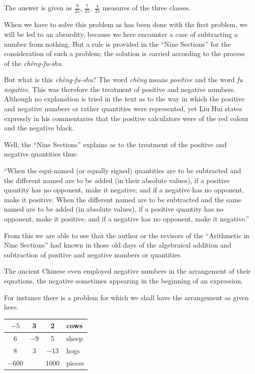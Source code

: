 \documentclass[11pt]{article}
\newcommand{\scanpage}[2]{\clearpage\setcounter{footnote}{0}\noindent{\footnotesize\color{gray}PDF page #1 · #2}\par\medskip}
\newcommand{\scanfooter}{}
\newcommand{\fangtableF}{\begin{tabular}{|c|c|c|l|}\hline $-5$&3&2&cows\\\hline 6&$-9$&5&sheep\\\hline 8&3&$-13$&hogs\\\hline $-600$&&1000&pieces\\\hline\end{tabular}}
\begin{document}
The answer is given as $\frac9{25}$, $\frac7{25}$, $\frac4{25}$ measures of the three classes.

When we have to solve this problem as has been done with the first problem, we will be led to an absurdity, because we here encounter a case of subtracting a number from nothing. But a rule is provided in the ``Nine Sections'' for the consideration of such a problem; the solution is carried according to the process of the \emph{chêng-fu-shu}.

But what is this \emph{chêng-fu-shu}? The word \emph{chêng} means \emph{positive} and the word \emph{fu} \emph{negative}. This was therefore the treatment of positive and negative numbers. Although no explanation is tried in the text as to the way in which the positive and negative numbers or rather quantities were represented, yet Liu Hui states expressly in his commentaries that the positive calculators were of the red colour and the negative black.

Well, the ``Nine Sections'' explains as to the treatment of the positive and negative quantities thus:
\scanfooter

\scanpage{0035}{Chapter 3, printed page 21}
``When the equi-named (or equally signed) quantities are to be subtracted and the different named are to be added (in their absolute values), if a positive quantity has no opponent, make it negative; and if a negative has no opponent, make it positive. When the different named are to be subtracted and the same named are to be added (in absolute values), if a positive quantity has no opponent, make it positive; and if a negative has no opponent, make it negative.''

From this we are able to see that the author or the revisors of the ``Arithmetic in Nine Sections'' had known in those old days of the algebraical addition and subtraction of positive and negative numbers or quantities.

The ancient Chinese even employed negative numbers in the arrangement of their equations, the negative sometimes appearing in the beginning of an expression.

\begin{center}
\begin{minipage}{0.28\linewidth}
\raggedright
For instance there is a problem for which we shall have the arrangement as given here.
\end{minipage}\hfill
\begin{minipage}{0.66\linewidth}
\centering\fangtableF
\end{minipage}
\end{center}
\end{document}
